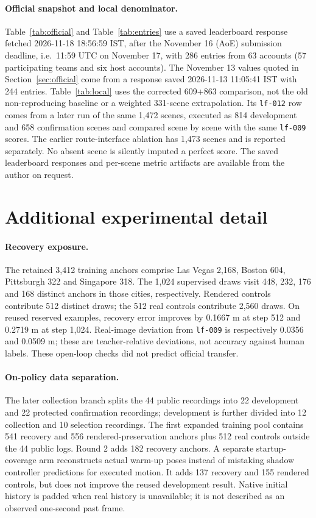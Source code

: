 \documentclass{article}
\newcommand{\lf}{\texttt{lf-009}}
\begin{document}
\paragraph{Official snapshot and local denominator.}
Table~\ref{tab:official} and Table~\ref{tab:entries} use a saved leaderboard response fetched 2026-11-18 18:56:59 IST, after the November 16 (AoE) submission deadline, i.e.\ 11:59 UTC on November 17, with 286 entries from 63 accounts (57 participating teams and six host accounts). The November 13 values quoted in Section~\ref{sec:official} come from a response saved 2026-11-13 11:05:41 IST with 244 entries. Table~\ref{tab:local} uses the corrected 609+863 comparison, not the old non-reproducing baseline or a weighted 331-scene extrapolation. Its \texttt{lf-012} row comes from a later run of the same 1,472 scenes, executed as 814 development and 658 confirmation scenes and compared scene by scene with the same \lf{} scores. The earlier route-interface ablation has 1,473 scenes and is reported separately. No absent scene is silently imputed a perfect score. The saved leaderboard responses and per-scene metric artifacts are available from the author on request.

\section{Additional experimental detail}\label{app:detail}
\paragraph{Recovery exposure.}
The retained 3,412 training anchors comprise Las Vegas 2,168, Boston 604, Pittsburgh 322 and Singapore 318. The 1,024 supervised draws visit 448, 232, 176 and 168 distinct anchors in those cities, respectively. Rendered controls contribute 512 distinct draws; the 512 real controls contribute 2,560 draws. On reused reserved examples, recovery error improves by 0.1667 m at step 512 and 0.2719 m at step 1,024. Real-image deviation from \lf{} is respectively 0.0356 and 0.0509 m; these are teacher-relative deviations, not accuracy against human labels. These open-loop checks did not predict official transfer.

\paragraph{On-policy data separation.}
The later collection branch splits the 44 public recordings into 22 development and 22 protected confirmation recordings; development is further divided into 12 collection and 10 selection recordings. The first expanded training pool contains 541 recovery and 556 rendered-preservation anchors plus 512 real controls outside the 44 public logs. Round 2 adds 182 recovery anchors. A separate startup-coverage arm reconstructs actual warm-up poses instead of mistaking shadow controller predictions for executed motion. It adds 137 recovery and 155 rendered controls, but does not improve the reused development result. Native initial history is padded when real history is unavailable; it is not described as an observed one-second past frame.
\end{document}
